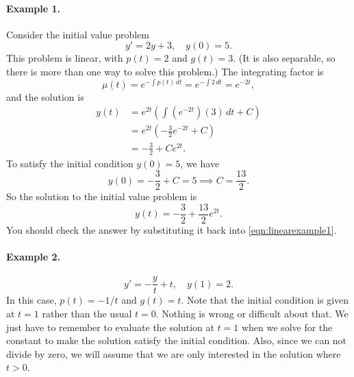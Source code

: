 \documentclass[reqno]{immbook}
\begin{document}
\paragraph{Example 1.}
Consider the initial value problem
\begin{equation}
   y' = 2y + 3, \quad y(0) = 5.
\label{eqn:linearexample1}
\end{equation}
This problem is linear, with $p(t)=2$ and $g(t) = 3$.
(It is also separable, so there is more than one way
to solve this problem.)
The integrating factor is
\begin{equation}
   \mu(t) = e^{-\int p(t)\,dt} = e^{-\int 2\, dt}
      = e^{-2t},
\end{equation}
and the solution is
\begin{equation}
\begin{split}
   y(t) & = e^{2t} \left( \int \left(e^{-2t}\right)\left(3\right)\,dt + C\right) \\
        & = e^{2t} \left( -\frac{3}{2} e^{-2t} +C \right) \\
	& = -\frac{3}{2} + Ce^{2t}.
\end{split}
\end{equation}
To satisfy the initial condition $y(0)=5$, we have
\begin{equation}
   y(0) = -\frac{3}{2} + C = 5 \implies C = \frac{13}{2} .
\end{equation}
So the solution to the initial value problem is
\begin{equation}
   y(t) = -\frac{3}{2} + \frac{13}{2}e^{2t}.
\end{equation}
You should check the answer by substituting it back
into \eqref{eqn:linearexample1}.

\paragraph{Example 2.}
\begin{equation}
   y' = -\frac{y}{t} + t, \quad y(1) = 2.
\end{equation}
In this case, $p(t) = -1/t$ and $g(t) = t$.
Note that the initial condition is given at
$t=1$ rather than the usual $t=0$.  Nothing
is wrong or difficult about that. We just have
to remember to evaluate the solution at $t=1$
when we solve for the constant to make
the solution satisfy the initial condition.
Also, since we can not divide by zero, we will
assume that we are only interested in the solution
where $t > 0$.
\end{document}
